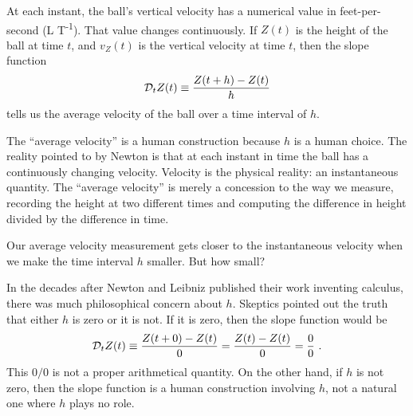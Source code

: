 \documentclass[
  letterpaper,
  DIV=11,
  numbers=noendperiod,
  oneside]{scrreprt}
\begin{document}
At each instant, the ball's vertical velocity has a numerical value in
feet-per-second (L T\textsuperscript{-1}). That value changes
continuously. If \(Z(t)\) is the height of the ball at time \(t\), and
\(v_Z(t)\) is the vertical velocity at time \(t\), then the slope
function \[{\cal D}_t Z(t) \equiv \frac{Z(t+h) - Z(t)}{h}\] tells us the
average velocity of the ball over a time interval of \(h\).

The ``average velocity'' is a human construction because \(h\) is a
human choice. The reality pointed to by Newton is that at each instant
in time the ball has a continuously changing velocity. Velocity is the
physical reality: an instantaneous quantity. The ``average velocity'' is
merely a concession to the way we measure, recording the height at two
different times and computing the difference in height divided by the
difference in time.

Our average velocity measurement gets closer to the instantaneous
velocity when we make the time interval \(h\) smaller. But how small?

In the decades after Newton and Leibniz published their work inventing
calculus, there was much philosophical concern about \(h\). Skeptics
pointed out the truth that either \(h\) is zero or it is not. If it is
zero, then the slope function would be
\[{\cal D}_t Z(t) \equiv \frac{Z(t+0) - Z(t)}{0} = \frac{Z(t) - Z(t)}{0} = \frac{0}{0}\ .\]
This \(0/0\) is not a proper arithmetical quantity. On the other hand,
if \(h\) is not zero, then the slope function is a human construction
involving \(h\), not a natural one where \(h\) plays no role.
\end{document}
